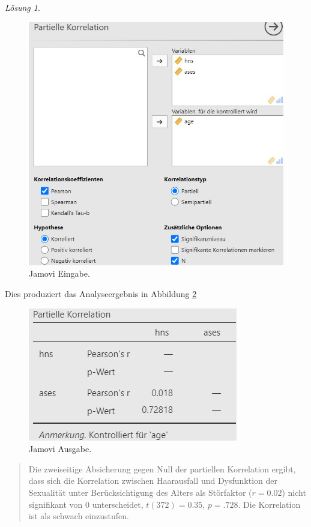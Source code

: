 \documentclass[
]{book}
\theoremstyle{definition}
\theoremstyle{definition}
\theoremstyle{definition}
\theoremstyle{definition}
\theoremstyle{remark}
\newtheorem*{solution}{Lösung}
\begin{document}
\begin{solution}
\begin{figure}
{\centering \includegraphics[width=1\linewidth]{figures/08-exr-hairloss-sex-jmv-input-partiell} 

}

\caption{Jamovi Eingabe.}\label{fig:sol-hairloss-sex-input-partiell}
\end{figure}

Dies produziert das Analyseergebnis in Abbildung \ref{fig:sol-hairloss-sex-output-partiell}

\begin{figure}

{\centering \includegraphics[width=0.5\linewidth]{figures/08-exr-hairloss-sex-jmv-output-partiell} 

}

\caption{Jamovi Ausgabe.}\label{fig:sol-hairloss-sex-output-partiell}
\end{figure}

\begin{quote}
Die zweiseitige Absicherung gegen Null der partiellen Korrelation ergibt, dass sich die Korrelation zwischen Haarausfall und Dysfunktion der Sexualität unter Berücksichtigung des Alters als Störfaktor (\(r = 0.02\)) nicht signifikant von \(0\) unterscheidet, \(t(372) = 0.35\), \(p = .728\). Die Korrelation ist als schwach einzustufen.
\end{quote}

\end{solution}
\end{document}
